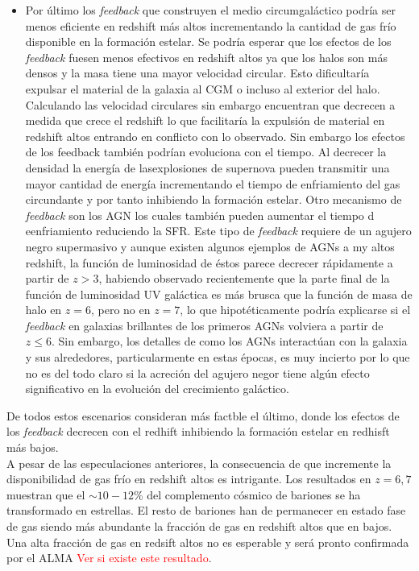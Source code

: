 \begin{itemize}
\item Por último los \textit{feedback} que construyen el medio circumgaláctico podría ser menos eficiente en redshift más altos incrementando la cantidad de gas frío disponible en la formación estelar. Se podría esperar que los efectos de los \textit{feedback} fuesen menos efectivos en redshift altos ya que los halos son más densos y la masa tiene una mayor velocidad circular. Esto dificultaría expulsar el material de la galaxia al CGM o incluso al exterior del halo. Calculando las velocidad circulares sin embargo encuentran que decrecen a medida que crece el redshift lo que facilitaría la expulsión de material en redshift altos entrando en conflicto con lo observado. Sin embargo los efectos de los feedback también podrían evoluciona con el tiempo. Al decrecer la densidad la energía de lasexplosiones de supernova pueden transmitir una mayor cantidad de energía incrementando el tiempo de enfriamiento del gas circundante y por tanto inhibiendo la formación estelar. Otro mecanismo de \textit{feedback} son los AGN los cuales también pueden aumentar el tiempo d eenfriamiento reduciendo la SFR. Este tipo de \textit{feedback} requiere de un agujero negro supermasivo y aunque existen algunos ejemplos de AGNs a my altos redshift, la función de luminosidad de éstos parece decrecer rápidamente a partir de $z>3$, habiendo observado recientemente que la parte final de la función de luminosidad UV galáctica es más brusca que la función de masa de halo en $z=6$, pero no en $z=7$, lo que hipotéticamente podría explicarse si el \textit{feedback} en galaxias brillantes de los primeros AGNs volviera a partir de $z\leq 6$. Sin embargo, los detalles de como los AGNs interactúan con la galaxia y sus alrededores, particularmente en estas épocas, es muy incierto por lo que no es del todo claro si la acreción del agujero negor tiene algún efecto significativo en la evolución del crecimiento galáctico.
\end{itemize}

De todos estos escenarios \cite{finkelstein2015increasing} consideran más factble el último, donde los efectos de los \textit{feedback} decrecen con el redhift inhibiendo la formación estelar en redhisft más bajos.\\

A pesar de las especulaciones anteriores, la consecuencia de que incremente la disponibilidad de gas frío en redshift altos es intrigante. Los resultados en $z=6,7$ muestran que el $\sim 10-12$\% del complemento cósmico de bariones se ha transformado en estrellas. El resto de bariones han de permanecer en estado fase de gas siendo más abundante la fracción de gas en redshift altos que en bajos. Una alta fracción de gas en redsift altos no es esperable y será pronto confirmada por el ALMA \textcolor{red}{Ver si existe este resultado}.\\

